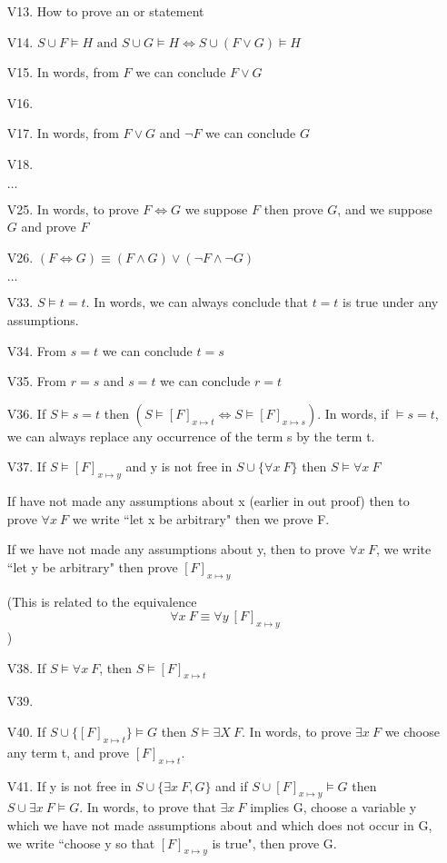 

\begin{enumerate}
\item[V13.] How to prove an or statement
\item[V14.] $S\cup F \vDash H \text{ and } S\cup G\vDash H \Longleftrightarrow S\cup (F\vee G)\vDash H$
\item[V15.] In words, from $F$ we can conclude $F\vee G$
\item[V16.] 
\item[V17.] In words, from $F\vee G$ and $\neg F$ we can conclude $G$
\item[V18.]
\item[$\dots$]
\item[V25.] In words, to prove $F\iff G$ we suppose $F$ then prove $G$, and we suppose $G$ and prove $F$
\item[V26.] $(F\iff G) \equiv (F\wedge G) \vee (\neg F \wedge \neg G)$
\item[$\dots$]
\item[V33.] $S\vDash t=t$. In words, we can always conclude that $t=t$ is true under any assumptions.
\item[V34.] From $s=t$ we can conclude $t=s$
\item[V35.] From $r=s$ and $s=t$ we can conclude $r=t$
\item[V36.] If $S\vDash s=t$ then $(S\vDash[F]_{x\mapsto t} \iff S\vDash[F]_{x\mapsto s})$. In words, if $\vDash s=t$, we can always replace any occurrence of the term s by the term t.
\item[V37.] If $S\vDash [F]_{x\mapsto y}$ and y is not free in $S\cup \{\forall x \ F\}$ then $S\vDash \forall x \ F$

If have not made any assumptions about x (earlier in out proof) then to prove $\forall x \ F$ we write ``let x be arbitrary" then we prove F.

If we have not made any assumptions about y, then to prove $\forall x \ F$, we write ``let y be arbitrary" then prove $[F]_{x\mapsto y}$

(This is related to the equivalence $$\forall x \ F \equiv \forall y \ [F]_{x\mapsto y}$$)

\item[V38.] If $S\vDash\forall x \ F$, then $S\vDash[F]_{x\mapsto t}$
\item[V39.]
\item[V40.] If $S\cup \{[F]_{x\mapsto t}\}\vDash G$ then $S\vDash \exists X \ F$. In words, to prove $\exists x \ F$  we choose any term t, and prove $[F]_{x\mapsto t}$.
\item[V41.] If y is not free in $S\cup \{\exists x \ F , G\}$ and if $S\cup [F]_{x\mapsto y}\vDash G$ then $S\cup \exists x \ F \vDash G$. In words, to prove that $\exists x \ F $ implies G, choose a variable y which we have not made assumptions about and which does not occur in G, we write ``choose y so that $[F]_{x\mapsto y}$ is true", then prove G.

\end{enumerate}


